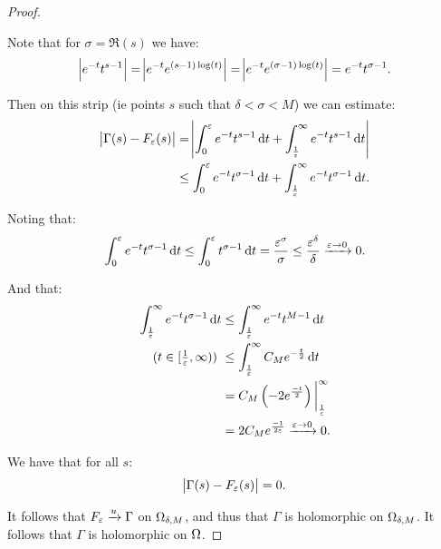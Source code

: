 \begin{proof}
\begin{center}
\end{center}


Note that for $\sigma = \Re (s)$ we have:
\begin{align*}
    \abs{e^{-t}t^{s-1}} = \abs{e^{-t}e^{(s-1) \log(t)}} = \abs{e^{-t}e^{(\sigma-1) \log(t)}} = e^{-t}t^{\sigma-1}.
\end{align*}

Then on this strip (ie points $s$ such that $\delta < \sigma < M$) we can estimate:
\begin{align*}
    \abs{\Gamma(s) - F_\varepsilon(s)} &= \abs{\int_0^\varepsilon e^{-t} t^{s-1} \dif t + \int_\frac{1}{\varepsilon}^\infty e^{-t} t^{s-1} \dif t}\\
    & \leq \int_0^\varepsilon e^{-t} t^{\sigma-1} \dif t + \int_\frac{1}{\varepsilon}^\infty e^{-t} t^{\sigma-1} \dif t.
\end{align*}

Noting that:
\begin{align*}
    \int_0^\varepsilon e^{-t} t^{\sigma-1} \dif t \leq \int_0^\varepsilon t^{\sigma-1} \dif t = \frac{\varepsilon^\sigma}{\sigma} \leq \frac{\varepsilon^\delta}{\delta} \xrightarrow[]{\varepsilon \to 0} 0.
\end{align*}

And that:
\begin{align*}
    \int_\frac{1}{\varepsilon}^\infty e^{-t} t^{\sigma-1} \dif t &\leq \int_\frac{1}{\varepsilon}^\infty e^{-t} t^{M-1} \dif t\\
    \text{($t\in [\tfrac{1}{\varepsilon}, \infty)$) } &\leq \int_\frac{1}{\varepsilon}^\infty C_M e^{-\frac{t}{2}} \dif t\\
    &= C_M \br{-2 e^{\frac{-t}{2}}} \bigg|_\frac{1}{\varepsilon}^\infty\\
    &= 2C_M e^{\frac{-1}{2\varepsilon}} \xrightarrow[]{\varepsilon \to 0} 0.
\end{align*}

We have that for all $s$:
\begin{align*}
    \abs{\Gamma(s) - F_\varepsilon(s)} = 0.
\end{align*}

It follows that $F_\varepsilon \xrightarrow[]{u} \Gamma$ on $\Omega_{\delta, M}$, and thus that $\Gamma $ is holomorphic on $\Omega_{\delta, M}$. It follows that $\Gamma$ is holomorphic on $\Omega$.
\end{proof}


